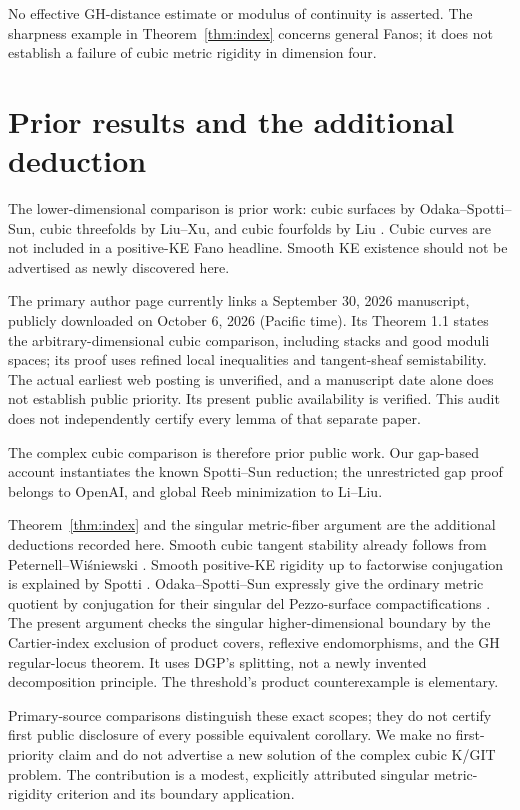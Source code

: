 \documentclass[11pt]{article}
\begin{document}
No effective GH-distance estimate or modulus of continuity is asserted.
The sharpness example in Theorem~\ref{thm:index} concerns general Fanos;
it does not establish a failure of cubic metric rigidity in dimension
four.

\section{Prior results and the additional deduction}
The lower-dimensional comparison is prior work: cubic surfaces by
Odaka--Spotti--Sun, cubic threefolds by Liu--Xu, and cubic fourfolds by
Liu \cite{OSS,LX,Liu}. Cubic curves are not included in a positive-KE
Fano headline. Smooth KE existence should not be advertised as newly
discovered here.

The primary author page \cite{KSZZ} currently links a September 30, 2026
manuscript, publicly downloaded on October 6, 2026 (Pacific time).
Its Theorem 1.1 states the arbitrary-dimensional cubic comparison,
including stacks and good moduli spaces; its proof uses refined local
inequalities and tangent-sheaf semistability. The actual earliest web
posting is unverified, and a manuscript date alone does not establish
public priority. Its present public availability is verified. This
audit does not independently certify every lemma of that separate paper.

The complex cubic comparison is therefore prior public work. Our
gap-based account instantiates the known Spotti--Sun reduction; the
unrestricted gap proof belongs to OpenAI, and global Reeb minimization
to Li--Liu.

Theorem~\ref{thm:index} and the singular metric-fiber argument are the
additional deductions recorded here. Smooth cubic tangent stability
already follows from Peternell--Wi\'sniewski
\cite[Corollary 1.5 and Theorem 2.3]{PW}. Smooth positive-KE rigidity up
to factorwise conjugation is explained by Spotti \cite[Theorem 1.1.1]{Spotti}.
Odaka--Spotti--Sun expressly give the ordinary metric quotient by
conjugation for their singular del Pezzo-surface compactifications
\cite[\S\S1--2]{OSS}. The present argument checks the singular
higher-dimensional boundary by the Cartier-index exclusion of product
covers, reflexive endomorphisms, and the GH regular-locus theorem.
It uses DGP's splitting, not a newly invented decomposition principle.
The threshold's product counterexample is elementary.

Primary-source comparisons distinguish these exact scopes; they do
not certify first public disclosure of every possible equivalent
corollary. We make no first-priority claim and do not advertise a new
solution of the complex cubic K/GIT problem. The contribution is a
modest, explicitly attributed singular metric-rigidity criterion and
its boundary application.
\end{document}
